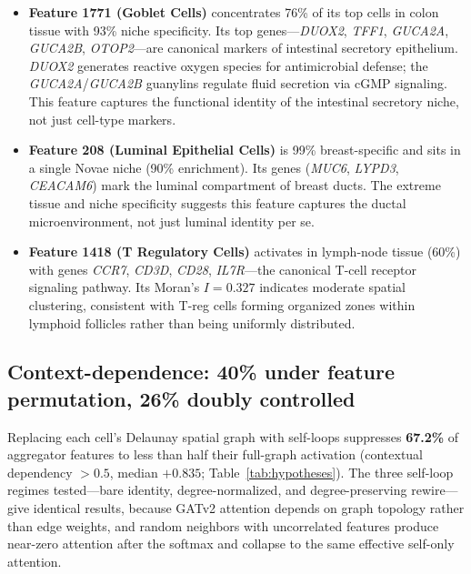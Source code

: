 \documentclass[11pt]{article}
\begin{document}
\begin{itemize}
\item \textbf{Feature 1771 (Goblet Cells)} concentrates 76\% of its
      top cells in colon tissue with 93\% niche specificity. Its top
      genes---\emph{DUOX2}, \emph{TFF1}, \emph{GUCA2A}, \emph{GUCA2B},
      \emph{OTOP2}---are canonical markers of intestinal secretory
      epithelium. \emph{DUOX2} generates reactive oxygen species for
      antimicrobial defense; the \emph{GUCA2A}/\emph{GUCA2B} guanylins regulate
      fluid secretion via cGMP signaling. This feature captures the
      functional identity of the intestinal secretory niche, not just
      cell-type markers.

\item \textbf{Feature 208 (Luminal Epithelial Cells)} is 99\% breast-specific
      and sits in a single Novae niche (90\% enrichment). Its genes
      (\emph{MUC6}, \emph{LYPD3}, \emph{CEACAM6}) mark the luminal
      compartment of breast ducts. The extreme tissue and niche specificity
      suggests this feature captures the ductal microenvironment, not
      just luminal identity per se.

\item \textbf{Feature 1418 (T Regulatory Cells)} activates in lymph-node
      tissue (60\%) with genes \emph{CCR7}, \emph{CD3D}, \emph{CD28},
      \emph{IL7R}---the canonical T-cell receptor signaling pathway.
      Its Moran's $I = 0.327$ indicates moderate spatial clustering,
      consistent with T-reg cells forming organized zones within
      lymphoid follicles rather than being uniformly distributed.
\end{itemize}

\subsection{Context-dependence: 40\% under feature permutation, 26\% doubly controlled}
\label{sec:graph_ablation}

Replacing each cell's Delaunay spatial graph with self-loops
suppresses \textbf{67.2\%} of aggregator features to less than half
their full-graph activation (contextual dependency $> 0.5$, median
$+0.835$; Table~\ref{tab:hypotheses}). The three self-loop regimes
tested---bare identity, degree-normalized, and degree-preserving
rewire---give identical results, because GATv2 attention depends on
graph topology rather than edge weights, and random neighbors with
uncorrelated features produce near-zero attention after the softmax
and collapse to the same effective self-only attention.
\end{document}
